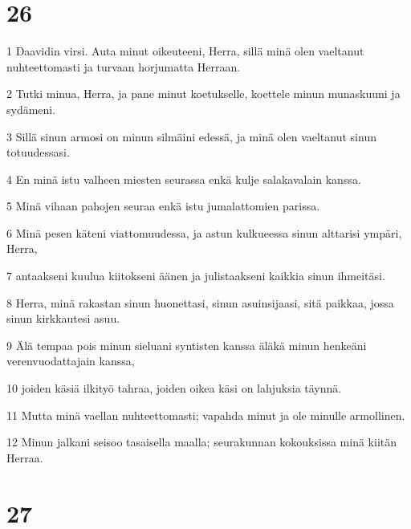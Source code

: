 \chapter{26}

\par 1 Daavidin virsi. Auta minut oikeuteeni, Herra, sillä minä olen vaeltanut nuhteettomasti ja turvaan horjumatta Herraan.
\par 2 Tutki minua, Herra, ja pane minut koetukselle, koettele minun munaskuuni ja sydämeni.
\par 3 Sillä sinun armosi on minun silmäini edessä, ja minä olen vaeltanut sinun totuudessasi.
\par 4 En minä istu valheen miesten seurassa enkä kulje salakavalain kanssa.
\par 5 Minä vihaan pahojen seuraa enkä istu jumalattomien parissa.
\par 6 Minä pesen käteni viattomuudessa, ja astun kulkueessa sinun alttarisi ympäri, Herra,
\par 7 antaakseni kuulua kiitokseni äänen ja julistaakseni kaikkia sinun ihmeitäsi.
\par 8 Herra, minä rakastan sinun huonettasi, sinun asuinsijaasi, sitä paikkaa, jossa sinun kirkkautesi asuu.
\par 9 Älä tempaa pois minun sieluani syntisten kanssa äläkä minun henkeäni verenvuodattajain kanssa,
\par 10 joiden käsiä ilkityö tahraa, joiden oikea käsi on lahjuksia täynnä.
\par 11 Mutta minä vaellan nuhteettomasti; vapahda minut ja ole minulle armollinen.
\par 12 Minun jalkani seisoo tasaisella maalla; seurakunnan kokouksissa minä kiitän Herraa.

\chapter{27}

